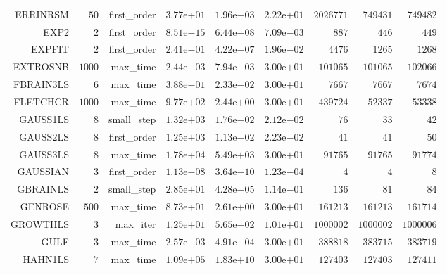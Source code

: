\begin{longtable}{rrrrrrrrr}
ERRINRSM & \(    50\) & first\_order & \( 3.77\)e\(+01\) & \( 1.96\)e\(-03\) & \( 2.22\)e\(+01\) & \(2026771\) & \(749431\) & \(749482\) \\
EXP2 & \(     2\) & first\_order & \( 8.51\)e\(-15\) & \( 6.44\)e\(-08\) & \( 7.09\)e\(-03\) & \(   887\) & \(   446\) & \(   449\) \\
EXPFIT & \(     2\) & first\_order & \( 2.41\)e\(-01\) & \( 4.22\)e\(-07\) & \( 1.96\)e\(-02\) & \(  4476\) & \(  1265\) & \(  1268\) \\
EXTROSNB & \(  1000\) & max\_time & \( 2.44\)e\(-03\) & \( 7.94\)e\(-03\) & \( 3.00\)e\(+01\) & \(101065\) & \(101065\) & \(102066\) \\
FBRAIN3LS & \(     6\) & max\_time & \( 3.88\)e\(-01\) & \( 2.33\)e\(-02\) & \( 3.00\)e\(+01\) & \(  7667\) & \(  7667\) & \(  7674\) \\
FLETCHCR & \(  1000\) & max\_time & \( 9.77\)e\(+02\) & \( 2.44\)e\(+00\) & \( 3.00\)e\(+01\) & \(439724\) & \( 52337\) & \( 53338\) \\
GAUSS1LS & \(     8\) & small\_step & \( 1.32\)e\(+03\) & \( 1.76\)e\(-02\) & \( 2.12\)e\(-02\) & \(    76\) & \(    33\) & \(    42\) \\
GAUSS2LS & \(     8\) & first\_order & \( 1.25\)e\(+03\) & \( 1.13\)e\(-02\) & \( 2.23\)e\(-02\) & \(    41\) & \(    41\) & \(    50\) \\
GAUSS3LS & \(     8\) & max\_time & \( 1.78\)e\(+04\) & \( 5.49\)e\(+03\) & \( 3.00\)e\(+01\) & \( 91765\) & \( 91765\) & \( 91774\) \\
GAUSSIAN & \(     3\) & first\_order & \( 1.13\)e\(-08\) & \( 3.64\)e\(-10\) & \( 1.23\)e\(-04\) & \(     4\) & \(     4\) & \(     8\) \\
GBRAINLS & \(     2\) & small\_step & \( 2.85\)e\(+01\) & \( 4.28\)e\(-05\) & \( 1.14\)e\(-01\) & \(   136\) & \(    81\) & \(    84\) \\
GENROSE & \(   500\) & max\_time & \( 8.73\)e\(+01\) & \( 2.61\)e\(+00\) & \( 3.00\)e\(+01\) & \(161213\) & \(161213\) & \(161714\) \\
GROWTHLS & \(     3\) & max\_iter & \( 1.25\)e\(+01\) & \( 5.65\)e\(-02\) & \( 1.01\)e\(+01\) & \(1000002\) & \(1000002\) & \(1000006\) \\
GULF & \(     3\) & max\_time & \( 2.57\)e\(-03\) & \( 4.91\)e\(-04\) & \( 3.00\)e\(+01\) & \(388818\) & \(383715\) & \(383719\) \\
HAHN1LS & \(     7\) & max\_time & \( 1.09\)e\(+05\) & \( 1.83\)e\(+10\) & \( 3.00\)e\(+01\) & \(127403\) & \(127403\) & \(127411\) \\

\end{longtable}
